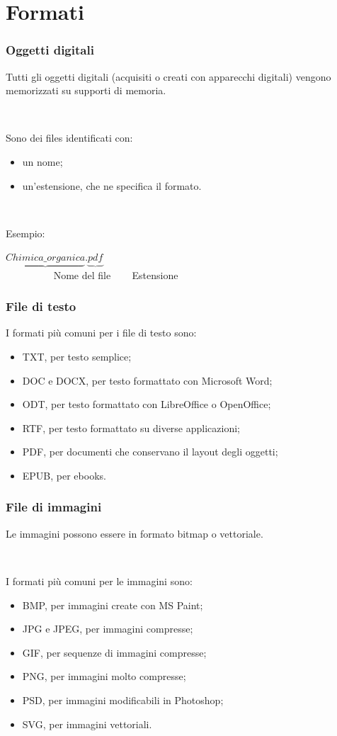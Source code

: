\documentclass[]{beamer}
\begin{document}
\section{Formati}

\begin{frame}
\frametitle{Oggetti digitali}
Tutti gli oggetti digitali (acquisiti o creati con apparecchi digitali) vengono memorizzati su supporti di memoria.\pause

~

Sono dei \alert{files} identificati con:
\begin{itemize}
  \item un nome;\pause
  \item un'estensione, che ne specifica il formato.\pause
\end{itemize}

~

Esempio:
\begin{center}
  $ \underbrace{Chimica\_organica}.\underbrace{pdf} $\\
  ~~~~~~~~~ Nome del file ~~~ Estensione
\end{center}
\end{frame}




\begin{frame}
\frametitle{File di testo}
I formati più comuni per i file di testo sono:
\begin{itemize}
  \item TXT, per testo semplice;\pause
  \item DOC e DOCX, per testo formattato con Microsoft Word;\pause
  \item ODT, per testo formattato con LibreOffice o OpenOffice;\pause
  \item RTF, per testo formattato su diverse applicazioni;\pause
  \item PDF, per documenti che conservano il layout degli oggetti;\pause
  \item EPUB, per ebooks.
\end{itemize}
\end{frame}


\begin{frame}
\frametitle{File di immagini}
Le immagini possono essere in formato \alert<1>{bitmap} o \alert<1>{vettoriale}.\pause

~

I formati più comuni per le immagini sono:
\begin{itemize}
  \item BMP, per immagini create con MS Paint;\pause
  \item JPG e JPEG, per immagini compresse;\pause
  \item GIF, per sequenze di immagini compresse;\pause
  \item PNG, per immagini molto compresse;\pause
  \item PSD, per immagini modificabili in Photoshop;\pause
  \item SVG, per immagini vettoriali.
\end{itemize}
\end{frame}
\end{document}

